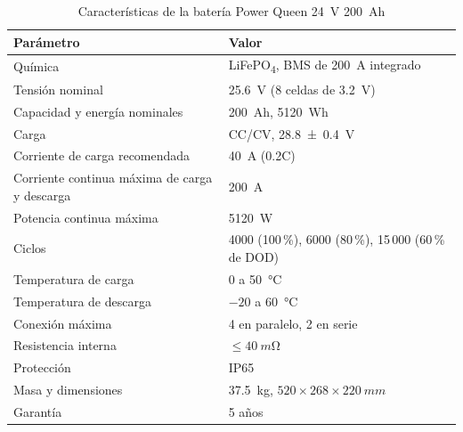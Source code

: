 \begin{table}[!htb]
\caption{Características de la batería Power Queen \SI{24}{V} \SI{200}{Ah} \cite{pq}}
\label{tab:bateria}
\centering
\footnotesize
\begin{tabular}{l l}
\toprule
Parámetro & Valor \\
\midrule
Química & LiFePO\textsubscript{4}, BMS de \SI{200}{A} integrado \\
Tensión nominal & \SI{25.6}{V} (8 celdas de \SI{3.2}{V}) \\
Capacidad y energía nominales & \SI{200}{Ah}, \SI{5120}{Wh} \\
Carga & CC/CV, \SI{28.8 \pm 0.4}{V} \\
Corriente de carga recomendada & \SI{40}{A} (0.2C) \\
Corriente continua máxima de carga y descarga & \SI{200}{A} \\
Potencia continua máxima & \SI{5120}{W} \\
Ciclos & 4000 (100\,\%), 6000 (80\,\%), 15\,000 (60\,\% de DOD) \\
Temperatura de carga & 0 a \SI{50}{\celsius} \\
Temperatura de descarga & $-20$ a \SI{60}{\celsius} \\
Conexión máxima & 4 en paralelo, 2 en serie \\
Resistencia interna & $\leq\SI{40}{m\ohm}$ \\
Protección & IP65 \\
Masa y dimensiones & \SI{37.5}{kg}, $520\times268\times\SI{220}{mm}$ \\
Garantía & 5 años \\
\bottomrule
\end{tabular}
\end{table}
